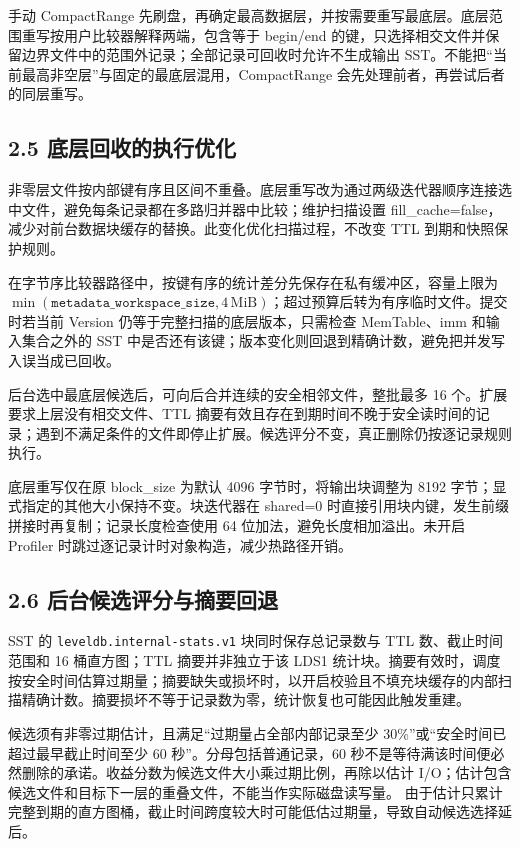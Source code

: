 \documentclass[UTF8,a4paper,10pt,twocolumn,fontset=fandol]{ctexart}
\begin{document}
手动 CompactRange 先刷盘，再确定最高数据层，并按需要重写最底层。底层范围重写按用户比较器解释两端，包含等于 begin/end 的键，只选择相交文件并保留边界文件中的范围外记录；全部记录可回收时允许不生成输出 SST。不能把“当前最高非空层”与固定的最底层混用，CompactRange 会先处理前者，再尝试后者的同层重写。

\subsection*{2.5 底层回收的执行优化}
非零层文件按内部键有序且区间不重叠。底层重写改为通过两级迭代器顺序连接选中文件，避免每条记录都在多路归并器中比较；维护扫描设置 fill\_cache=false，减少对前台数据块缓存的替换。此变化优化扫描过程，不改变 TTL 到期和快照保护规则。

在字节序比较器路径中，按键有序的统计差分先保存在私有缓冲区，容量上限为 $\min(\texttt{metadata\_workspace\_size},4\,\mathrm{MiB})$；超过预算后转为有序临时文件。提交时若当前 Version 仍等于完整扫描的底层版本，只需检查 MemTable、imm 和输入集合之外的 SST 中是否还有该键；版本变化则回退到精确计数，避免把并发写入误当成已回收。

后台选中最底层候选后，可向后合并连续的安全相邻文件，整批最多 16 个。扩展要求上层没有相交文件、TTL 摘要有效且存在到期时间不晚于安全读时间的记录；遇到不满足条件的文件即停止扩展。候选评分不变，真正删除仍按逐记录规则执行。

底层重写仅在原 block\_size 为默认 4096 字节时，将输出块调整为 8192 字节；显式指定的其他大小保持不变。块迭代器在 shared=0 时直接引用块内键，发生前缀拼接时再复制；记录长度检查使用 64 位加法，避免长度相加溢出。未开启 Profiler 时跳过逐记录计时对象构造，减少热路径开销。

\subsection*{2.6 后台候选评分与摘要回退}
SST 的 \texttt{leveldb.internal-stats.v1} 块同时保存总记录数与 TTL 数、截止时间范围和 16 桶直方图；TTL 摘要并非独立于该 LDS1 统计块。摘要有效时，调度按安全时间估算过期量；摘要缺失或损坏时，以开启校验且不填充块缓存的内部扫描精确计数。摘要损坏不等于记录数为零，统计恢复也可能因此触发重建。

候选须有非零过期估计，且满足“过期量占全部内部记录至少 30\%”或“安全时间已超过最早截止时间至少 60 秒”。分母包括普通记录，60 秒不是等待满该时间便必然删除的承诺。收益分数为候选文件大小乘过期比例，再除以估计 I/O；估计包含候选文件和目标下一层的重叠文件，不能当作实际磁盘读写量。 由于估计只累计完整到期的直方图桶，截止时间跨度较大时可能低估过期量，导致自动候选选择延后。
\end{document}
